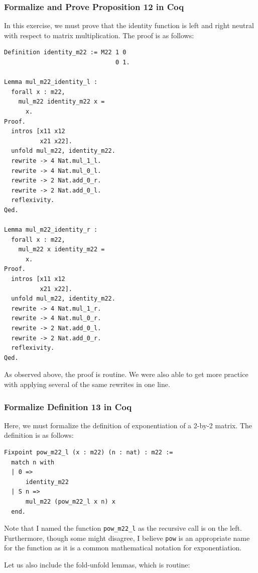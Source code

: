 \documentclass{article}
\begin{document}
\subsubsection{Formalize and Prove Proposition 12 in Coq}

In this exercise, we must prove that the identity function is left and right neutral with respect to matrix multiplication. The proof is as follows:

\begin{lstlisting}
Definition identity_m22 := M22 1 0
                               0 1.

Lemma mul_m22_identity_l :
  forall x : m22,
    mul_m22 identity_m22 x =
      x.
Proof.
  intros [x11 x12
          x21 x22].
  unfold mul_m22, identity_m22.
  rewrite -> 4 Nat.mul_1_l.
  rewrite -> 4 Nat.mul_0_l.
  rewrite -> 2 Nat.add_0_r.
  rewrite -> 2 Nat.add_0_l.
  reflexivity.
Qed.

Lemma mul_m22_identity_r :
  forall x : m22,
    mul_m22 x identity_m22 =
      x.
Proof.
  intros [x11 x12
          x21 x22].
  unfold mul_m22, identity_m22.
  rewrite -> 4 Nat.mul_1_r.
  rewrite -> 4 Nat.mul_0_r.
  rewrite -> 2 Nat.add_0_l.
  rewrite -> 2 Nat.add_0_r.
  reflexivity.
Qed.
\end{lstlisting}

As observed above, the proof is routine. We were also able to get more practice with applying several of the same rewrites in one line. 

\subsubsection{Formalize Definition 13 in Coq}

Here, we must formalize the definition of exponentiation of a 2-by-2 matrix. The definition is as follows:

\begin{lstlisting}
Fixpoint pow_m22_l (x : m22) (n : nat) : m22 :=
  match n with
  | 0 =>
      identity_m22
  | S n =>
      mul_m22 (pow_m22_l x n) x
  end.
\end{lstlisting}

Note that I named the function \texttt{pow\_m22\_l} as the recursive call is on the left. Furthermore, though some might disagree, I believe \texttt{pow} is an appropriate name for the function as it is a common mathematical notation for exponentiation.

Let us also include the fold-unfold lemmas, which is routine:
\end{document}
